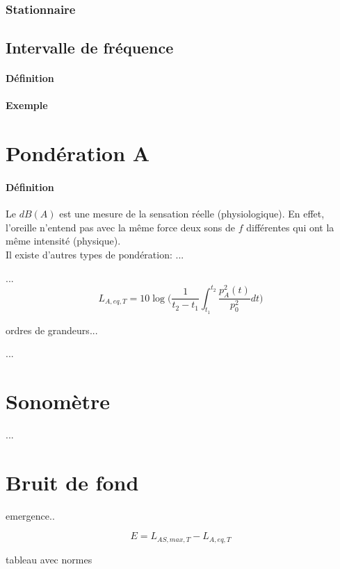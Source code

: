 \documentclass[11pt]{report}
\begin{document}
\subsubsection{Stationnaire}


\subsection{Intervalle de fréquence}
\paragraph{Définition }

\paragraph{Exemple }







\section{Pondération A}
\paragraph{Définition } Le $dB(A)$ est une mesure de la sensation réelle (physiologique). En effet, l'oreille n'entend pas avec la même force deux sons de $f$ différentes qui ont la même intensité (physique). \\

Il existe d'autres types de pondération: ...

...
$$L_{A,eq,T} = 10 \log \Bigg ( \frac{1}{t_2-t_1} \int_{t_1}^{t_2} \frac{p_A^2(t)}{p^2_0}dt \Bigg)$$



ordres de grandeurs...


...

\section{Sonomètre}
...


\section{Bruit de fond}
emergence..

$$E=L_{AS,max,T}-L_{A,eq,T}$$


tableau avec normes
\end{document}
